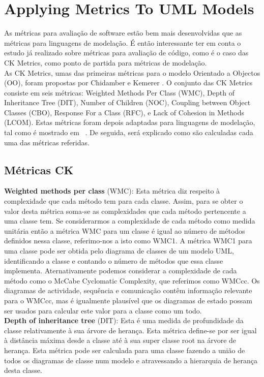 \section{Applying Metrics To UML Models}

As métricas para avaliação de  software estão bem mais desenvolvidas que as métricas para linguagens de modelação. É então interessante ter em conta o estudo já realizado sobre métricas para avaliação de código, como é o caso das CK Metrics, como ponto de partida para métricas de modelação.\\
As CK Metrics, umas das primeiras métricas para o modelo Orientado a Objectos (OO), foram propostas por Chidamber e  Kemerer \cite{Chidamber:1994:MSO:630808.631131}. O conjunto das CK Metrics consiste em seis métricas: Weighted Methods Per Class (WMC), Depth of Inheritance Tree (DIT), Number of Children (NOC), Coupling between Object Classes (CBO), Response For a Class (RFC), e Lack of Cohesion in Methods (LCOM). Estas métricas foram depois adaptadas para linguagens de modelação, tal como é mostrado em ~\cite{Power2}. De seguida, será explicado como são calculadas cada uma das métricas referidas.

\subsection{Métricas \textrm{CK}}
\textbf{Weighted methods per class} (WMC):
Esta métrica diz respeito à complexidade que cada método tem para cada classe. Assim, para se obter o valor desta métrica soma-se
as complexidades que cada método pertencente a uma classe tem. Se considerarmos a complexidade de cada método como medida unitária
então a métrica WMC para um classe é igual ao número de métodos definidos nessa classe, referimo-nos a isto como WMC1.
A métrica WMC1 para uma classe pode ser obtida pelo diagrama de classes de um modelo UML, identificando a classe e contando o número
de métodos que essa classe implementa. Aternativamente podemos considerar a complexidade de cada método como o McCabe Cyclomatic Complexity, que referimos
como WMCcc. Os diagramas de actividade, sequência e comunicação contêm informação relevante para o WMCcc, mas é igualmente
plausível que os diagramas de estado possam ser usados para calcular este valor para a classe como um todo.\\

\textbf{Depth of inheritance tree} (DIT):
Esta é uma medida de profundidade da classe relativamente à sua árvore de herança. Esta métrica define-se por ser igual à distância máxima
desde a classe até à sua super classe root na árvore de herança. Esta métrica pode ser calculada para uma classe fazendo a união de todos os diagramas
de classe num modelo \umlS e atravessando a hierarquia de herança desta classe.\\

